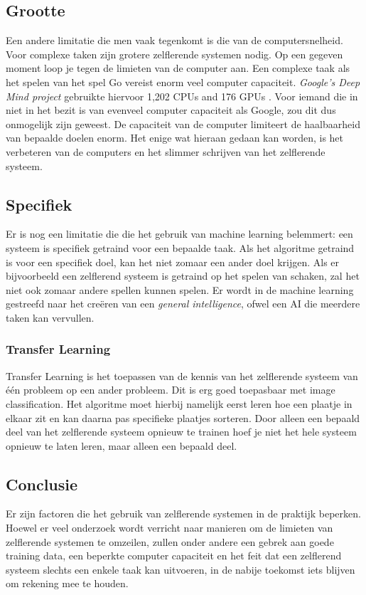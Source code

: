 \subsection{Grootte}
Een andere limitatie die men vaak tegenkomt is die van de computersnelheid. Voor complexe taken zijn grotere zelflerende systemen nodig. Op een gegeven moment loop je tegen de limieten van de computer aan. Een complexe taak als het spelen van het spel Go vereist enorm veel computer capaciteit. \textit{Google’s Deep Mind project} gebruikte hiervoor 1,202 CPUs and 176 GPUs \cite{GoogleDeepMindArticle}.  Voor iemand die in niet in het bezit is van evenveel computer capaciteit als Google, zou dit dus onmogelijk zijn geweest. De capaciteit van de computer limiteert de haalbaarheid van bepaalde doelen enorm. Het enige wat hieraan gedaan kan worden, is het verbeteren van de computers en het slimmer schrijven van het zelflerende systeem.

\subsection{Specifiek}
Er is nog een limitatie die die het gebruik van machine learning belemmert: een systeem is specifiek getraind voor een bepaalde taak.  Als het algoritme getraind is voor een specifiek doel, kan het niet zomaar een ander doel krijgen. Als er bijvoorbeeld een zelflerend systeem is getraind op het spelen van schaken, zal het niet ook zomaar andere spellen kunnen spelen. Er wordt in de machine learning gestreefd naar het creëren van een \textit{general intelligence}, ofwel een AI die meerdere taken kan vervullen. 

\subsubsection{Transfer Learning}
Transfer Learning is het toepassen van de kennis van het zelflerende systeem van \'{e}\'{e}n probleem op een ander probleem. Dit is erg goed toepasbaar met image classification. Het algoritme moet hierbij namelijk eerst leren hoe een plaatje in elkaar zit en kan daarna pas specifieke plaatjes sorteren. Door alleen een bepaald deel van het zelflerende systeem opnieuw te trainen hoef je niet het hele systeem opnieuw te laten leren, maar alleen een bepaald deel. 

\subsection{Conclusie}
Er zijn factoren die het gebruik van zelflerende systemen in de praktijk beperken. Hoewel er veel onderzoek wordt verricht naar manieren om de limieten van zelflerende systemen te omzeilen, zullen onder andere een gebrek aan goede training data, een beperkte computer capaciteit en het feit dat een zelflerend systeem slechts een enkele taak kan uitvoeren, in de nabije toekomst iets blijven om rekening mee te houden.

